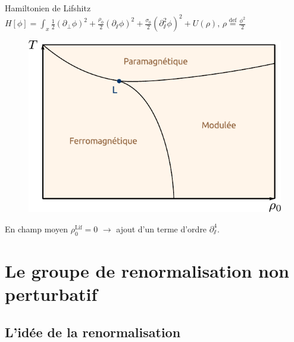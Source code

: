 \documentclass[xcolor=dvipsnames]{beamer}
\newcommand{\p}[1]{\partial_{#1}}
\newcommand{\define}{\ensuremath{ \overset{\text{def}}{=} }}
\begin{document}
\begin{frame}

\begin{block}{Hamiltonien de Lifshitz}
\centering
$ H[\phi] = \int_x  \frac{1}{2}(\p{\perp} \phi)^2 + \frac{\rho_0}{2}(\p{\sslash}\phi)^2 + \frac{\sigma_0}{2} (\p{\sslash}^2 \phi)^2 + U(\rho) \text{,~} \rho \define \frac{\phi^2}{2}$
\end{block}

\begin{figure}[htp]
\centering
\includegraphics[scale=0.65]{img/phase_diagram.pdf}
\label{}
\end{figure}

En champ moyen $\rho^{\text{Lif}}_0 = 0$ $\rightarrow$ \textcolor{BrickRed}{ajout d'un terme d'ordre $\partial_\sslash^4$}.

\end{frame}

\section{Le groupe de renormalisation non perturbatif}
\subsection{L'idée de la renormalisation}
\end{document}
